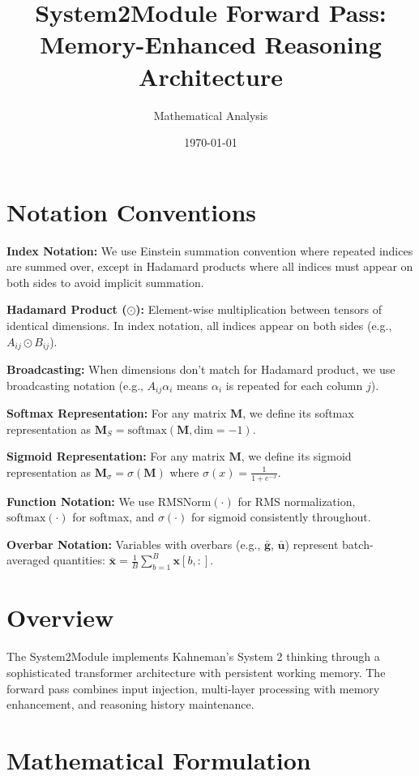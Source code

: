 \documentclass{article}
\title{System2Module Forward Pass: Memory-Enhanced Reasoning Architecture}
\author{Mathematical Analysis}
\date{\today}
\begin{document}
\maketitle

\section{Notation Conventions}

\textbf{Index Notation:} We use Einstein summation convention where repeated indices are summed over, except in Hadamard products where all indices must appear on both sides to avoid implicit summation.

\textbf{Hadamard Product ($\odot$):} Element-wise multiplication between tensors of identical dimensions. In index notation, all indices appear on both sides (e.g., $A_{ij} \odot B_{ij}$).

\textbf{Broadcasting:} When dimensions don't match for Hadamard product, we use broadcasting notation (e.g., $A_{ij} \alpha_i$ means $\alpha_i$ is repeated for each column $j$).

\textbf{Softmax Representation:} For any matrix $\mathbf{M}$, we define its softmax representation as $\mathbf{M}_S = \text{softmax}(\mathbf{M}, \text{dim}=-1)$.

\textbf{Sigmoid Representation:} For any matrix $\mathbf{M}$, we define its sigmoid representation as $\mathbf{M}_\sigma = \sigma(\mathbf{M})$ where $\sigma(x) = \frac{1}{1 + e^{-x}}$.

\textbf{Function Notation:} We use $\text{RMSNorm}(\cdot)$ for RMS normalization, $\text{softmax}(\cdot)$ for softmax, and $\sigma(\cdot)$ for sigmoid consistently throughout.

\textbf{Overbar Notation:} Variables with overbars (e.g., $\bar{\mathbf{g}}$, $\bar{\mathbf{u}}$) represent batch-averaged quantities: $\bar{\mathbf{x}} = \frac{1}{B}\sum_{b=1}^{B} \mathbf{x}[b, :]$.

\section{Overview}

The System2Module implements Kahneman's System 2 thinking through a sophisticated transformer architecture with persistent working memory. The forward pass combines input injection, multi-layer processing with memory enhancement, and reasoning history maintenance.

\section{Mathematical Formulation}
\end{document}
